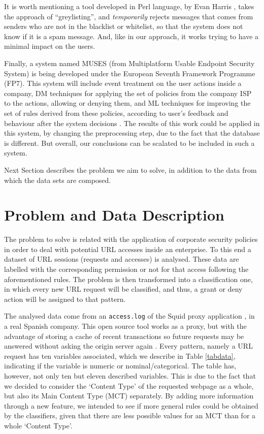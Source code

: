 \documentclass{llncs}
\begin{document}
It is worth mentioning a tool developed in Perl language, by Evan Harris \cite{harris2003next}, takes the approach of ``greylisting'', and \textit{temporarily} rejects messages that comes from senders who are not in the blacklist or whitelist, so that the system does not know if it is a spam message. And, like in our approach, it works trying to have a minimal impact on the users.

Finally, a system named MUSES (from Multiplatform Usable Endpoint
Security System) \cite{MUSES_SAC_14} is being developed under the
European Seventh Framework Programme (FP7). This system will include
event treatment on the user actions inside a company, DM techniques
for applying the set of policies from the company ISP to the actions,
allowing or denying them, and ML techniques for improving the set of
rules derived from these policies, according to user's feedback and
behaviour after the system decisions \cite{muses_sotics_13}. The results of this work could be applied in this system, by changing the preprocessing step, due to the fact that the database is different. But overall, our conclusions can be scalated to be included in such a system.   

Next Section describes the problem we aim to solve, in addition to the data from which the data sets are composed.


%

\section{Problem and Data Description} 
\label{sec:problemDescription}

\noindent The problem to solve is related with the application of corporate security policies in order to deal with potential URL accesses inside an enterprise. To this end a dataset of URL sessions (requests and accesses) is analysed. These data are labelled with the corresponding permission or not for that access following the aforementioned rules. The problem is then transformed into a classification one, in which every new URL request will be classified, and thus, a grant or deny action will be assigned to that pattern.

The analysed data come from an \texttt{access.log} of the Squid
proxy application
\cite{squid:site}, in a real Spanish company. This open source tool
works as a proxy, but with the advantage of storing a cache of recent
transactions so future requests may be answered without asking the
origin server again \cite{DuaneWessels2004}.  
Every pattern, namely a URL request has ten variables associated,
which we describe in Table \ref{tabdata}, indicating if the variable
is numeric or nominal/categorical. The table has, however, not only ten but eleven described variables. This is due to the fact that we decided to consider the `Content Type' of the requested webpage as a whole, but also its Main Content Type (MCT) separately. By adding more information through a new feature, we intended to see if more general rules could be obtained by the classifiers, given that there are less possible values for an MCT than for a whole `Content Type'.
\end{document}

